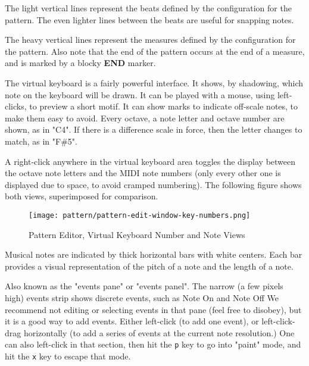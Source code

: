    \setcounter{ItemCounter}{0}      %

   The light vertical lines represent the beats defined by the configuration
   for the pattern.  The even lighter lines between the beats are useful for
   snapping notes.

   The heavy vertical lines represent the measures defined by the
   configuration for the pattern.
   Also note that the end of the pattern
   occurs at the end of a measure, and is marked by a blocky \textbf{END}
   marker.

   The virtual keyboard is a fairly powerful interface.  It shows,
   by shadowing, which note on the keyboard will be drawn. It can be
   played with a mouse, using left-clicks, to preview a short motif.
   It can show marks to indicate off-scale notes, to make them easy to
   avoid.  Every octave, a note letter and octave number are shown, as in
   "C4".  If there is a difference scale in force, then the letter changes to
   match, as in "F\#5".

   A right-click anywhere in the virtual keyboard area toggles the display
   between the octave note letters and the MIDI note numbers (only every other
   one is displayed due to space, to avoid cramped numbering).
   The following figure shows both views, superimposed for comparison.

\begin{figure}[H]
   \centering 
   \texttt{[image: pattern/pattern-edit-window-key-numbers.png]}
   \caption{Pattern Editor, Virtual Keyboard Number and Note Views}
   \label{fig:pattern_editor_key_numbers}
\end{figure}

   Musical notes are indicated by thick horizontal bars with white
   centers.  Each bar provides
   a visual representation of the pitch of a note and the length of a note.

   Also known as the "events pane" or "events panel".
   The narrow (a few pixels high) events strip shows discrete events,
   such as Note On and Note Off
   We recommend not editing or selecting events
   in that pane (feel free to disobey), but it is a good way to add events.
   Either
   left-click (to add one event),
   or left-click-drag horizontally (to add a
   series of events at the current note resolution.)  One can also
   left-click in that section,
   then hit the \texttt{p} key to go into "paint" mode,
   and hit the \texttt{x} key to escape that mode.

